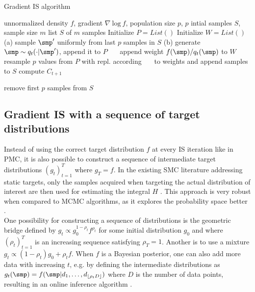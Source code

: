 \begin{algorithm}[tb]

\caption{Gradient IS algorithm}
\begin{algorithmic}
\label{algo:lis}
    unnormalized density $f$, gradient $\nabla~\textrm{log}~f$, population size $p$, $p$ intial samples $S$, sample size $m$
     list $S$ of $m$ samples
   	\STATE Initialize $P = List()$
	\STATE Initialize $W = List()$
		\STATE (a) sample $\smp' $ uniformly from last $p$ samples in $S$
		\STATE (b) generate $\smp \sim q_{t}(\cdot | \smp' )$, append it to $P$
		\STATE ~~~append weight $f(\smp)/q_{t}(\smp)$ to $W$
   	\ENDFOR
	\STATE resample $p$ values from $P$ with repl. according 
	\STATE ~~~to weights and append samples to $S$
	\STATE compute $C_{t+1}$

   \ENDWHILE

   \STATE remove first $p$ samples from $S$
\end{algorithmic}

\end{algorithm}

\subsection{Gradient IS with a sequence of target distributions}
\label{sec:seqin}
Instead of using the correct target distribution $f$ at every IS iteration like in PMC, it is also possible to construct a sequence of intermediate target distributions $(g_t)_{t=1}^T$ where $g_T = f$. In the existing SMC literature addressing static targets, only the samples acquired when targeting the actual distribution of interest are then used for estimating the integral $H$ \cite{DelMoral2006,Schafer2013}. This approach is very robust when compared to MCMC algorithms, as it explores the probability space better \cite{Schafer2013,Chopin2002}.\\
One possibility for constructing a sequence of distributions is the geometric bridge defined by $g_t \propto g_0^{1-\rho_t} f^{\rho_t}$  for some initial distribution $g_0$ and where $(\rho_t)_{t=1}^T$ is an increasing sequence satisfying $\rho_T = 1$. Another is to use a mixture $g_t \propto ({1-\rho_t})g_0+ {\rho_t}f$. When $f$ is a Bayesian posterior, one can also add more data with increasing $t$, e.g. by defining the intermediate distributions as $g_t(\smp) = f(\smp|d_1,\dots,d_{\floor{\rho_t D}})$ where $D$ is the number of data points, resulting in an online inference algorithm \cite{Chopin2002}.

